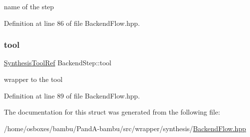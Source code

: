 name of the step 



Definition at line 86 of file Backend\+Flow.\+hpp.

\mbox{\label{structBackendStep_aa34e0b7ceeb99fd07301832b9c68f462}} 
\subsubsection{\texorpdfstring{tool}{tool}}
{\footnotesize\ttfamily \hyperlink{SynthesisTool_8hpp_af82cb8fc071612a27507a7c212097e58}{Synthesis\+Tool\+Ref} Backend\+Step\+::tool}



wrapper to the tool 



Definition at line 89 of file Backend\+Flow.\+hpp.



The documentation for this struct was generated from the following file\+:\begin{DoxyCompactItemize}
\item 
/home/osboxes/bambu/\+Pand\+A-\/bambu/src/wrapper/synthesis/\hyperlink{BackendFlow_8hpp}{Backend\+Flow.\+hpp}\end{DoxyCompactItemize}
